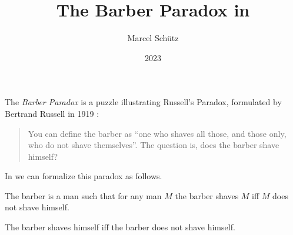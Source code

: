 \documentclass{stex}
\title{The Barber Paradox in \Naproche}
\author{Marcel Schütz}
\date{2023}
\begin{document}
\maketitle


\noindent The \emph{Barber Paradox} is a puzzle illustrating Russell's Paradox, formulated by Bertrand Russell in 1919 \cite[p. 355]{Russell1919}:

\begin{quotation}
  \noindent You can define the barber as “one who shaves all those, and those only, who do not shave themselves”.
  The question is, does the barber shave himself?
\end{quotation}

\noindent In \Naproche we can formalize this paradox as follows.

\begin{fsignature*}
  The barber is a man such that for any man $M$ the barber shaves $M$ iff $M$ does not shave himself.
\end{fsignature*}

\begin{ftheorem*}[label=barber_paradox,title=Barber Paradox]
  The barber shaves himself iff the barber does not shave himself.
\end{ftheorem*}

\printbibliography
\end{document}
